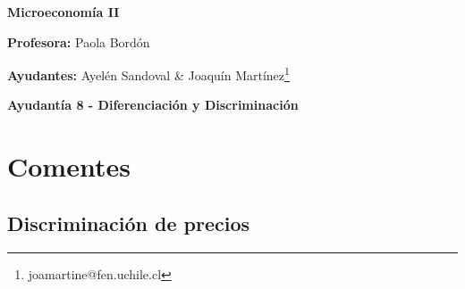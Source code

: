 \documentclass{exam}
\renewcommand{\thefootnote}{\fnsymbol{footnote}}
\begin{document}
\begin{center}

\LARGE{\textbf{Microeconomía II}}

\medskip
\normalsize \textbf{Profesora:} Paola Bordón

\normalsize \textbf{Ayudantes:} Ayelén Sandoval \& Joaquín Martínez\footnote[2]{joamartine@fen.uchile.cl}


\medskip
\large{\textbf{Ayudantía 8 - Diferenciación y Discriminación}}

\end{center}

\tableofcontents

\renewcommand{\thefootnote}{\Roman{footnote}}

\section{Comentes}
\subsection{Discriminación de precios}
\end{document}
